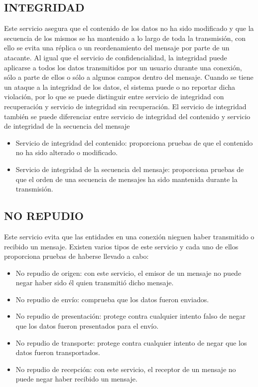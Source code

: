 \subsection{INTEGRIDAD}
Este servicio asegura que el contenido de los datos no ha sido modificado y que la secuencia de los mismos se ha mantenido a lo largo de toda la transmisión, con ello se evita una réplica o un reordenamiento del mensaje por parte de un atacante.
Al igual que el servicio de confidencialidad, la integridad puede aplicarse a todos los datos transmitidos por un usuario durante una conexión, sólo a parte de ellos o sólo a algunos campos dentro del mensaje.
Cuando se tiene un ataque a la integridad de los datos, el sistema puede o no reportar dicha violación, por lo que se puede distinguir entre servicio de integridad con recuperación y servicio de integridad sin recuperación.
El servicio de integridad también se puede diferenciar entre servicio de integridad del contenido y servicio de integridad de la secuencia del mensaje
\begin{itemize}
	\item Servicio de integridad del contenido: proporciona pruebas de que el contenido no ha sido alterado o modificado.
	\item Servicio de integridad de la secuencia del mensaje: proporciona pruebas de que el orden de una secuencia de mensajes ha sido mantenida durante la transmisión.
\end{itemize}

\subsection{NO REPUDIO}
Este servicio evita que las entidades en una conexión nieguen haber transmitido o recibido un mensaje.
Existen varios tipos de este servicio y cada uno de ellos proporciona pruebas de haberse llevado a cabo:
\begin{itemize}
	\item No repudio de origen: con este servicio, el emisor de un mensaje no puede negar haber sido él quien transmitió dicho mensaje.
	\item No repudio de envío: comprueba que los datos fueron enviados.
	\item No repudio de presentación: protege contra cualquier intento falso de negar que los datos fueron presentados para el envío.
	\item No repudio de transporte: protege contra cualquier intento de negar que los datos fueron transportados.
	\item No repudio de recepción: con este servicio, el receptor de un mensaje no puede negar haber recibido un mensaje.
\end{itemize}

